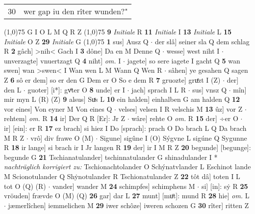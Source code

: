 \documentclass[8pt,a4paper,notitlepage]{article}
\begin{document}
\begin{table}[ht]
\begin{minipage}[t]{0.5\linewidth}
\begin{tabular}{rl}
30 & wer gap iu den rîter wunden?"\\ 
\end{tabular}
\scriptsize
\line(1,0){75} \newline
G I O L M Q R Z \newline
\line(1,0){75} \newline
\textbf{9} \textit{Initiale} R  \textbf{11} \textit{Initiale} I  \textbf{13} \textit{Initiale} L  \textbf{15} \textit{Initiale} O Z  \textbf{29} \textit{Initiale} G  \newline
\line(1,0){75} \newline
\textbf{1} sus] Ausz Q  $\cdot$ der slâ] seiner sla Q dem schlag R \textbf{2} gâch] >nih< Gach I \textbf{3} dône] Da en M Denne Q  $\cdot$ wesse] west niht I  $\cdot$ unverzagte] vnuertzagt Q \textbf{4} niht] \textit{om.} I  $\cdot$ jagete] so sere iagete I gacht Q \textbf{5} wan swen] wan >swen< I Wan wen L M Wann Q Wen R  $\cdot$ sâhen] ye gesahen Q sagen Z \textbf{6} sô er dem] so er den G Dem er O So e dem R \textbf{7} gruozte] gruͤzt I (Z)  $\cdot$ der] den L  $\cdot$ guoter] [i*]: gvͦter O \textbf{8} unde] er I  $\cdot$ jach] sprach I L R  $\cdot$ sus] vnsz Q  $\cdot$ mîn] mir myn L (R) (Z) \textbf{9} alsus] Suͯs L \textbf{10} ein halden] einhalben G am halden Q \textbf{12} vor eines] Von eyner M Von eines Q  $\cdot$ velses] velsen I R velschis M \textbf{13} ûz] vor Z  $\cdot$ rehtem] \textit{om.} R \textbf{14} ir] Der Q R [Er]: Jr Z  $\cdot$ wâre] rehte O \textit{om.} R \textbf{15} der] ÷er O  $\cdot$ ir] [ein]: er R \textbf{17} ez brach] si hiez I Do [sprach]: prach O Do brach L Q Da brach M R Z  $\cdot$ vrô] div frawe O (M)  $\cdot$ Sigune] sigûne I (O) Sýgvne L sigúne Q Sygunne R \textbf{18} ir lange] si brach ir I Jr langen R \textbf{19} der] ir I M R Z \textbf{20} begunde] [begunge]: begunde G \textbf{21} Tschianatulander] tschinnatulander G shinadulander I * \textit{nachträglich korrigiert zu:} Tschionachtolander O Schýnatvlander L Eschinot lande M Scionotulander Q Shẏnotulander R Tschionatulander Z \textbf{22} tôt dâ] toten I L tot O (Q) (R)  $\cdot$ vander] wander M \textbf{24} schimpfes] schimphens M  $\cdot$ si] [in]: sẏ R \textbf{25} vröuden] frævde O (M) (Q) \textbf{26} gar] dar L \textbf{27} munt] [muͦt]: mund R \textbf{28} hie] \textit{om.} L  $\cdot$ jæmerlîchen] iemmelichen M \textbf{29} iwer schôze] iweren schozen G \textbf{30} rîter] ritten Z \newline
\end{minipage}
\hspace{0.5cm}
\begin{minipage}[t]{0.5\linewidth}

\end{minipage}
\end{table}
\end{document}
